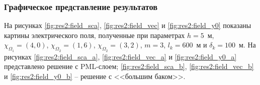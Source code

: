 \documentclass[a4paper,14pt]{article}
\begin{document}
\subsubsection{Графическое представление результатов}
На рисунках \ref{fig:res2:field_sca}, \ref{fig:res2:field_vec} и \ref{fig:res2:field_y0} показаны картины электрического поля, полученные при параметрах $h=5$~м, $\chi_{\Omega_1} = (4, 0)$, $\chi_{\Omega_2} = (1, 6)$, $\chi_{\Omega_2} = (3, 2)$, $m=3$, $l_k = 600$~м и $\delta_k = 100$~м. На рисунках \ref{fig:res2:field_sca_a}, \ref{fig:res2:field_vec_a} и \ref{fig:res2:field_y0_a} представлено решение с PML-слоем; \ref{fig:res2:field_sca_b}, \ref{fig:res2:field_vec_b} и \ref{fig:res2:field_y0_b} -- решение с <<большим баком>>.

\begin{spacing}{1.0}
\setlength{\parskip}{0pt}


\end{spacing}
\end{document}
